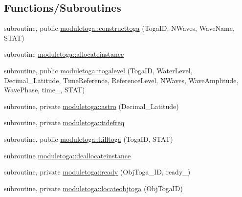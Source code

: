 \subsection*{Functions/\+Subroutines}
\begin{DoxyCompactItemize}
\item 
subroutine, public \mbox{\hyperlink{namespacemoduletoga_a49f980ff51e54f1045b60179a9ab5226}{moduletoga\+::constructtoga}} (Toga\+ID, N\+Waves, Wave\+Name, S\+T\+AT)
\item 
subroutine \mbox{\hyperlink{namespacemoduletoga_a307ed1550871bbb2f18f8facda132b11}{moduletoga\+::allocateinstance}}
\item 
subroutine, public \mbox{\hyperlink{namespacemoduletoga_a42e9e4f606a8d51d59a07cbe2c0a1299}{moduletoga\+::togalevel}} (Toga\+ID, Water\+Level, Decimal\+\_\+\+Latitude, Time\+Reference, Reference\+Level, N\+Waves, Wave\+Amplitude, Wave\+Phase, time\+\_\+, S\+T\+AT)
\item 
subroutine, private \mbox{\hyperlink{namespacemoduletoga_ae4a4ae3ca80be3e56570e30a039abd61}{moduletoga\+::astro}} (Decimal\+\_\+\+Latitude)
\item 
subroutine, private \mbox{\hyperlink{namespacemoduletoga_a910478c59872b8cd57611ae642b29980}{moduletoga\+::tidefreq}}
\item 
subroutine, public \mbox{\hyperlink{namespacemoduletoga_a9aa03039890445420290aa3feba13a89}{moduletoga\+::killtoga}} (Toga\+ID, S\+T\+AT)
\item 
subroutine \mbox{\hyperlink{namespacemoduletoga_a0c38f2a3f8f7a4b798bbc4b523196742}{moduletoga\+::deallocateinstance}}
\item 
subroutine, private \mbox{\hyperlink{namespacemoduletoga_a62311ad918280d20f2f5383ab0a8dac4}{moduletoga\+::ready}} (Obj\+Toga\+\_\+\+ID, ready\+\_\+)
\item 
subroutine, private \mbox{\hyperlink{namespacemoduletoga_a0dcf3a4301085371bb48ab041d1cec59}{moduletoga\+::locateobjtoga}} (Obj\+Toga\+ID)
\end{DoxyCompactItemize}
